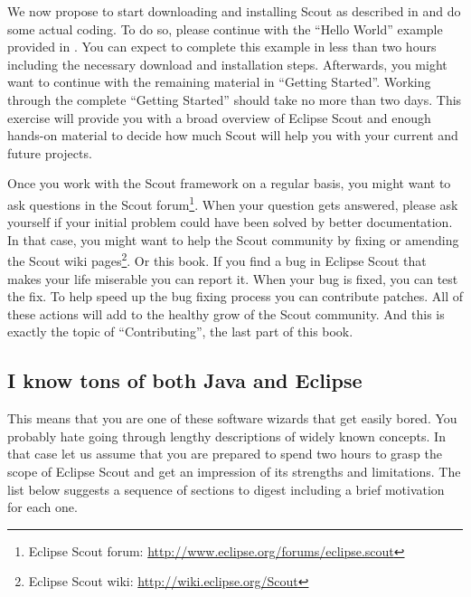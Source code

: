 \documentclass[a4paper,10pt,twoside]{book}
\begin{document}
We now propose to start downloading and installing Scout as described in  and do some actual coding.
To do so, please continue with the ``Hello World'' example provided in .
You can expect to complete this example in less than two hours including the necessary download and installation steps.
Afterwards, you might want to continue with the remaining material in ``Getting Started''. 
Working through the complete ``Getting Started'' should take no more than two days. 
This exercise will provide you with a broad overview of Eclipse Scout and enough hands-on material to decide how much Scout will help you with your current and future projects.

Once you work with the Scout framework on a regular basis, you might want to ask questions in the Scout 
forum\footnote{Eclipse Scout forum: \url{http://www.eclipse.org/forums/eclipse.scout}}.
When your question gets answered, please ask yourself if your initial problem could have been solved by better documentation.
In that case, you might want to help the Scout community by fixing or amending the Scout wiki pages\footnote{Eclipse Scout wiki: \url{http://wiki.eclipse.org/Scout}}.
Or this book. 
If you find a bug in Eclipse Scout that makes your life miserable you can report it. 
When your bug is fixed, you can test the fix.
To help speed up the bug fixing process you can contribute patches.
All of these actions will add to the healthy grow of the Scout community.
And this is exactly the topic of ``Contributing'', the last part of this book.

\subsection{I know tons of both Java and Eclipse}

This means that you are one of these software wizards that get easily bored.
You probably hate going through lengthy descriptions of widely known concepts.
In that case let us assume that you are prepared to spend two hours to grasp the scope of Eclipse Scout and get an impression of its strengths and limitations.
The list below suggests a sequence of sections to digest including a brief motivation for each one.
\end{document}
